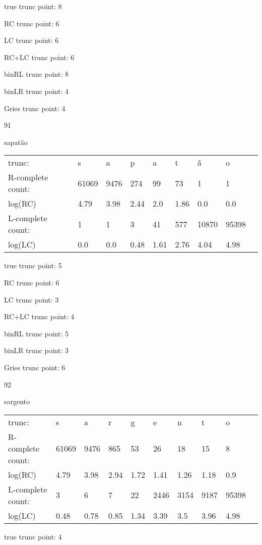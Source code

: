 \documentclass[10pt]{article}
\begin{document}
true trunc point: 8

RC trunc point: 6

LC trunc point: 6

RC+LC trunc point: 6

binRL trunc point: 8

binLR trunc point: 4

Gries trunc point: 4

\vspace{1em}

91

sapatão

\begin{tabular}{l|llllllll}
trunc: & s & a & p & a & t & ã & o & \\ 
R-complete count: & 61069 & 9476 & 274 & 99 & 73 & 1 & 1 & \\ 
log(RC) & 4.79 & 3.98 & 2.44 & 2.0 & 1.86 & 0.0 & 0.0 & \\ 
L-complete count: & 1 & 1 & 3 & 41 & 577 & 10870 & 95398 & \\ 
log(LC) & 0.0 & 0.0 & 0.48 & 1.61 & 2.76 & 4.04 & 4.98 & \\ 
\end{tabular}

true trunc point: 5

RC trunc point: 6

LC trunc point: 3

RC+LC trunc point: 4

binRL trunc point: 5

binLR trunc point: 3

Gries trunc point: 6

\vspace{1em}

92

sargento

\begin{tabular}{l|lllllllll}
trunc: & s & a & r & g & e & n & t & o & \\ 
R-complete count: & 61069 & 9476 & 865 & 53 & 26 & 18 & 15 & 8 & \\ 
log(RC) & 4.79 & 3.98 & 2.94 & 1.72 & 1.41 & 1.26 & 1.18 & 0.9 & \\ 
L-complete count: & 3 & 6 & 7 & 22 & 2446 & 3154 & 9187 & 95398 & \\ 
log(LC) & 0.48 & 0.78 & 0.85 & 1.34 & 3.39 & 3.5 & 3.96 & 4.98 & \\ 
\end{tabular}

true trunc point: 4
\end{document}
